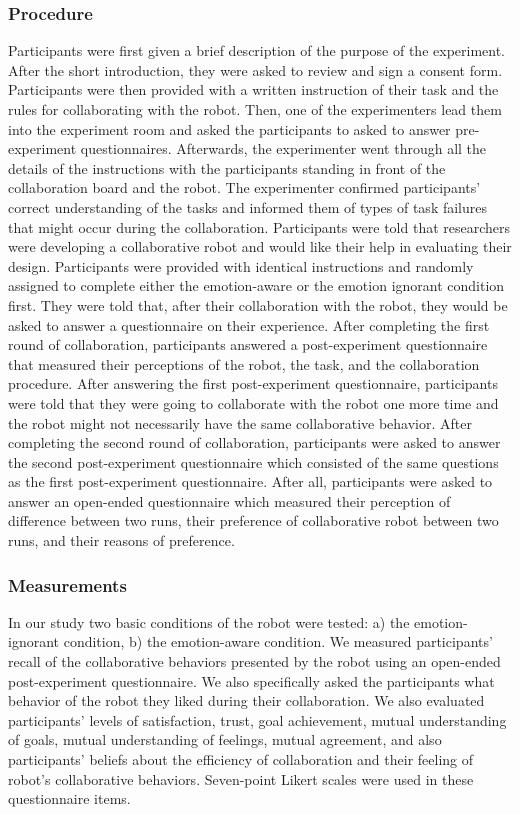 \documentclass[12pt]{report}
\begin{document}
\subsubsection{Procedure}
\label{sec:procedure}
Participants were first given a brief description of the purpose of the
experiment. After the short introduction, they were asked to review and sign a
consent form. Participants were then provided with a written instruction of
their task and the rules for collaborating with the robot. Then, one of the
experimenters lead them into the experiment room and asked the participants
to asked to answer pre-experiment questionnaires. Afterwards, the experimenter
went through all the details of the instructions with the participants
standing in front of the collaboration board and the robot. The experimenter
confirmed participants' correct understanding of the tasks and informed them
of types of task failures that might occur during the collaboration.
Participants were told that researchers were developing a collaborative robot
and would like their help in evaluating their design. Participants were provided
with identical instructions and randomly assigned to complete either the
emotion-aware or the emotion ignorant condition first. They were told that,
after their collaboration with the robot, they would be asked to answer a
questionnaire on their experience. After completing the first round of
collaboration, participants answered a post-experiment questionnaire that
measured their perceptions of the robot, the task, and the collaboration
procedure. After answering the first post-experiment questionnaire, participants
were told that they were going to collaborate with the robot one more time and
the robot might not necessarily have the same collaborative behavior. After
completing the second round of collaboration, participants were asked to answer
the second post-experiment questionnaire which consisted of the same questions
as the first post-experiment questionnaire. After all, participants were asked
to answer an open-ended questionnaire which measured their perception of
difference between two runs, their preference of collaborative robot between two
runs, and their reasons of preference.

\subsubsection{Measurements}
\label{sec:Measurements}
In our study two basic conditions of the robot were tested: a) the
emotion-ignorant condition, b) the emotion-aware condition. We measured
participants' recall of the collaborative behaviors presented by the robot using
an open-ended post-experiment questionnaire. We also specifically asked the
participants what behavior of the robot they liked during their collaboration.
We also evaluated participants' levels of satisfaction, trust, goal achievement,
mutual understanding of goals, mutual understanding of feelings, mutual
agreement, and also participants' beliefs about the efficiency of collaboration
and their feeling of robot's collaborative behaviors. Seven-point Likert scales
were used in these questionnaire items.
\end{document}
